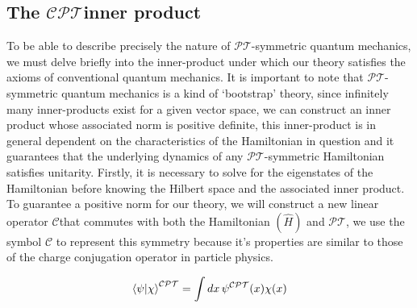 \documentclass[12pt, a4paper]{report}
\newcommand\PT{\(\mathcal{PT}\)}
\newcommand\CC{\(\mathcal{C}\)}
\begin{document}
\subsection{The \texorpdfstring{$\mathcal{CPT}$}\:\:inner product}\label{CPT}
To be able to describe precisely the nature of \PT-symmetric quantum mechanics, we must delve briefly into the inner-product under which our theory satisfies the axioms of conventional quantum mechanics. It is important to note that \PT-symmetric quantum mechanics is a kind of `bootstrap' theory\cite{MakingSense}, since infinitely many inner-products exist for a given vector space, we can construct an inner product whose associated norm is positive definite, this inner-product is in general dependent on the characteristics of the Hamiltonian in question and it guarantees that the underlying dynamics of any \PT-symmetric Hamiltonian satisfies unitarity\cite{MustaHbeHermitian}.
Firstly, it is necessary to solve for the eigenstates of the Hamiltonian before knowing the Hilbert space and the associated inner product.
To guarantee a positive norm for our theory, we will construct a new linear operator \CC that commutes with both the Hamiltonian $(\hat{H})$ and \PT, we use the symbol \CC\: to represent this symmetry because it's properties are similar to those of the charge conjugation operator in particle physics\cite{MakingSense}.

\begin{equation}\label{eq:3}
\braket{\psi|\chi}^{\mathcal{CPT}} = \int dx\,\psi^{\mathcal{CPT}}(x) \chi(x)
\end{equation}





\end{document}
